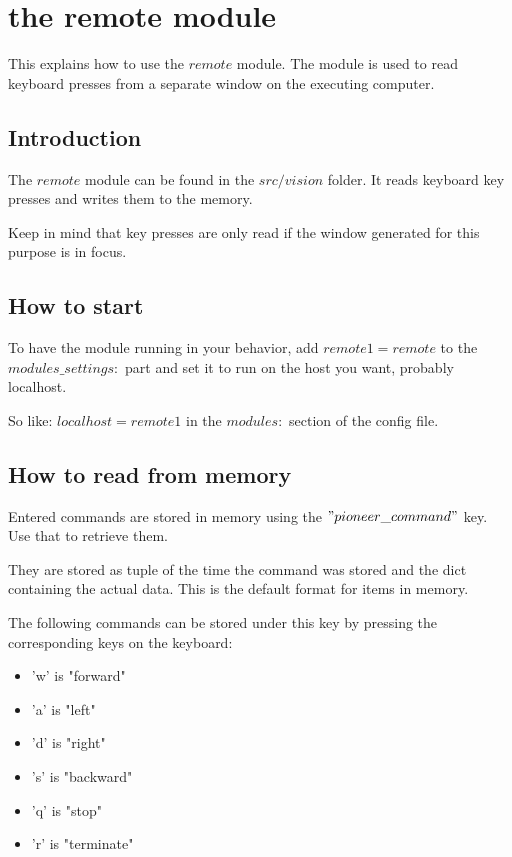 \documentclass[a4paper, 12pt, oneside]{report}
\title{\titleVariable}
\author{\authorVariable}
\date{\centering First release: \firstRelease \\ Last modification: \today}
\begin{document}
\maketitle

\chapter{the remote module}

This explains how to use the $remote$ module. 
The module is used to read keyboard presses from a separate window on the executing computer.

\section{Introduction}

The $remote$ module can be found in the $src/vision$ folder. It reads keyboard key presses and writes them to the memory. 

Keep in mind that key presses are only read if the window generated for this purpose is in focus.

\section{How to start}

To have the module running in your behavior, add $remote1 = remote$ to the $modules\_settings:$ part and set it to run on the host you want, probably localhost. 

So like: $localhost = remote1$ in the $modules:$ section of the config file.

\section{How to read from memory}

Entered commands are stored in memory using the $"pioneer\_command"$ key. Use that to retrieve them. 

They are stored as tuple of the time the command was stored and the dict containing the actual data. This is the default format for items in memory.

The following commands can be stored under this key by pressing the corresponding keys on the keyboard: 

\begin{itemize}
\item{}'w' is "forward"
\item{}'a' is "left"
\item{}'d' is "right"
\item{}'s' is "backward"
\item{}'q' is "stop"
\item{}'r' is "terminate"
\end{itemize}
\end{document}
